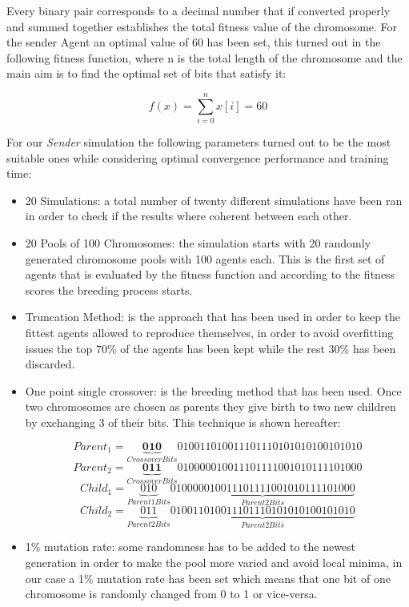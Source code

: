 \documentclass[a4paper]{article}
\begin{document}
Every binary pair corresponds to a decimal number that if converted properly and summed together establishes the total fitness value of the chromosome. For the sender Agent an optimal value of 60 has been set, this turned out in the following fitness function, where n is the total length of the chromosome and the main aim is to find the optimal set of bits that satisfy it:

\begin{equation}
	f(x) = \sum\limits_{i=0}^{n} x[i] = 60
\end{equation} 

For our \textit{Sender} simulation the following parameters turned out to be the most suitable ones while considering optimal convergence performance and training time:

\begin{itemize}

\item 20 Simulations: a total number of twenty different simulations have been ran in order to check if the results where coherent between each other.
\item 20 Pools of 100 Chromosomes: the simulation starts with 20 randomly generated chromosome pools with 100 agents each. This is the first set of agents that is evaluated by the fitness function and according to the fitness scores the breeding process starts. 
\item Truncation Method: is the approach that has been used in order to keep the fittest agents allowed to reproduce themselves, in order to avoid overfitting issues the top 70\% of the agents has been kept while the rest 30\% has been discarded.
\item One point single crossover: is the breeding method that has been used. Once two chromosomes are chosen as parents they give birth to two new children by exchanging 3 of their bits. This technique is shown hereafter:

\begin{equation}
	Parent_1 = \underbrace{\textbf{010}}_{Crossover Bits}{010011010011101110101010100101010}
\end{equation}
\begin{equation}
	Parent_2 = \underbrace{\textbf{011}}_{Crossover Bits}{010000010011101111001010111101000}
\end{equation}
\begin{equation}
	Child_1 = \underbrace{010}_{Parent 1 Bits} \underbrace{010000010011101111001010111101000}_{Parent 2 Bits}
\end{equation}
\begin{equation}
	Child_2 = \underbrace{011}_{Parent 2 Bits}\underbrace{010011010011101110101010100101010}_{Parent 2 Bits}
\end{equation}

\item 1\% mutation rate: some randomness has to be added to the newest generation in order to make the pool more varied and avoid local minima, in our case a 1\% mutation rate has been set which means that one bit of one chromosome is randomly changed from 0 to 1 or vice-versa.  

\end{itemize}
\end{document}
